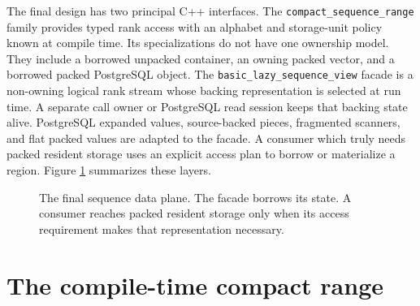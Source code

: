 The final design has two principal C++ interfaces.  The
\texttt{compact\_sequence\_range} family provides typed rank access with an
alphabet and storage-unit policy known at compile time.  Its specializations
do not have one ownership model.  They include a borrowed unpacked container,
an owning packed vector, and a borrowed packed PostgreSQL object.  The
\texttt{basic\_lazy\_sequence\_view} facade is a non-owning logical rank stream
whose backing representation is selected at run time.  A separate call owner
or PostgreSQL read session keeps that backing state alive.  PostgreSQL expanded
values, source-backed pieces, fragmented scanners, and flat packed values are
adapted to the facade.  A consumer which truly needs packed resident storage
uses an explicit access plan to borrow or materialize a region.  Figure
\ref{fig:sequence-abstraction-layers} summarizes these layers.

\begin{figure}[ht]
\centering
{}
\caption{The final sequence data plane.  The facade borrows its state.  A
consumer reaches packed resident storage only when its access requirement
makes that representation necessary.}
\label{fig:sequence-abstraction-layers}
\end{figure}

\section{The compile-time compact range}
\label{sec:compact-sequence-range}

